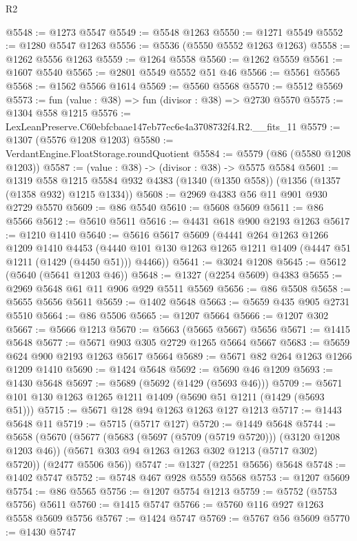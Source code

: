 \begin{lexlean}{R2}
\begin{coremodule}
@5548 := @1273 @5547
@5549 := @5548 @1263
@5550 := @1271 @5549
@5552 := @1280 @5547 @1263
@5556 := @5536 (@5550 @5552 @1263 @1263)
@5558 := @1262 @5556 @1263
@5559 := @1264 @5558
@5560 := @1262 @5559
@5561 := @1607 @5540
@5565 := @2801 @5549 @5552 @51 @46
@5566 := @5561 @5565
@5568 := @1562 @5566 @1614
@5569 := @5560 @5568
@5570 := @5512 @5569
@5573 := fun (value : @38) => fun (divisor : @38) => @2730 @5570
@5575 := @1304 @558 @1215
@5576 := LexLeanPreserve.C60ebfcbaae147eb77ec6e4a3708732f4.R2.__fits_11
@5579 := @1307 (@5576 @1208 @1203)
@5580 := VerdantEngine.FloatStorage.roundQuotient
@5584 := @5579 (@86 (@5580 @1208 @1203))
@5587 := (value : @38) -> (divisor : @38) -> @5575 @5584
@5601 := @1319
    @558
    @1215
    @5584
    @932
    @4383
    (@1340 (@1350 @558))
    (@1356 (@1357 (@1358 @932) @1215 @1334))
@5608 := @2969 @4383 @56 @11 @901 @930 @2729 @5570
@5609 := @86 @5540
@5610 := @5608 @5609
@5611 := @86 @5566
@5612 := @5610 @5611
@5616 := @4431 @618 @900 @2193 @1263
@5617 := @1210 @1410
@5640 := @5616
    @5617
    @5609
    (@4441
      @264
      @1263
      @1266
      @1209
      @1410
      @4453
      (@4440 @101 @130 @1263 @1265 @1211 @1409 (@4447 @51 @1211 (@1429 (@4450 @51))) @4466))
@5641 := @3024 @1208
@5645 := @5612 (@5640 (@5641 @1203 @46))
@5648 := @1327 (@2254 @5609) @4383
@5655 := @2969 @5648 @61 @11 @906 @929 @5511 @5569
@5656 := @86 @5508
@5658 := @5655 @5656 @5611
@5659 := @1402 @5648
@5663 := @5659 @435 @905 @2731 @5510
@5664 := @86 @5506
@5665 := @1207 @5664
@5666 := @1207 @302
@5667 := @5666 @1213
@5670 := @5663 (@5665 @5667) @5656
@5671 := @1415 @5648
@5677 := @5671 @903 @305 @2729 @1265 @5664 @5667
@5683 := @5659 @624 @900 @2193 @1263 @5617 @5664
@5689 := @5671 @82 @264 @1263 @1266 @1209 @1410
@5690 := @1424 @5648
@5692 := @5690 @46 @1209
@5693 := @1430 @5648
@5697 := @5689 (@5692 (@1429 (@5693 @46)))
@5709 := @5671 @101 @130 @1263 @1265 @1211 @1409 (@5690 @51 @1211 (@1429 (@5693 @51)))
@5715 := @5671 @128 @94 @1263 @1263 @127 @1213
@5717 := @1443 @5648 @11
@5719 := @5715 (@5717 @127)
@5720 := @1449 @5648
@5744 := @5658
    (@5670
      (@5677
        (@5683 (@5697 (@5709 (@5719 @5720))) (@3120 @1208 @1203 @46))
        (@5671 @303 @94 @1263 @1263 @302 @1213 (@5717 @302) @5720))
      (@2477 @5506 @56))
@5747 := @1327 (@2251 @5656) @5648
@5748 := @1402 @5747
@5752 := @5748 @467 @928 @5559 @5568
@5753 := @1207 @5609
@5754 := @86 @5565
@5756 := @1207 @5754 @1213
@5759 := @5752 (@5753 @5756) @5611
@5760 := @1415 @5747
@5766 := @5760 @116 @927 @1263 @5558 @5609 @5756
@5767 := @1424 @5747
@5769 := @5767 @56 @5609
@5770 := @1430 @5747

\end{coremodule}
\end{lexlean}
